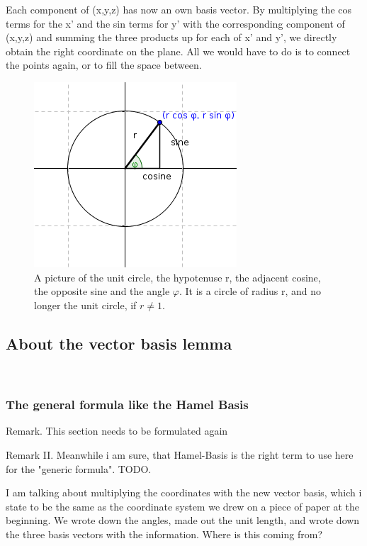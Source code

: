\documentclass[a4paper]{article}
\begin{document}
Each component of (x,y,z) has now an own basis vector. By multiplying the cos terms for the x' and the sin terms for y' with the corresponding component of (x,y,z) and summing the three products up for each of x' and y', we directly obtain the right coordinate on the plane. All we would have to do is to connect the points again, or to fill the space between. 

\begin{figure}[ht]
\includegraphics[scale=2]{unitcircle.png}
\caption{A picture of the unit circle, the hypotenuse r, the adjacent cosine, the opposite sine and the angle $\varphi$. It is a circle of radius r, and no longer the unit circle, if $r \neq 1$.}
\end{figure}

\subsection{About the vector basis lemma}\\

\subsubsection{The general formula like the Hamel Basis}

Remark. This section needs to be formulated again

Remark II. Meanwhile i am sure, that Hamel-Basis is the right term to use here for the "generic formula". TODO.

I am talking about multiplying the coordinates with the new vector basis, which i state to be the same as the coordinate system we drew on a piece of paper at the beginning. We wrote down the angles, made out the unit length, and wrote down the three basis vectors with the information. Where is this coming from?\\
\end{document}
